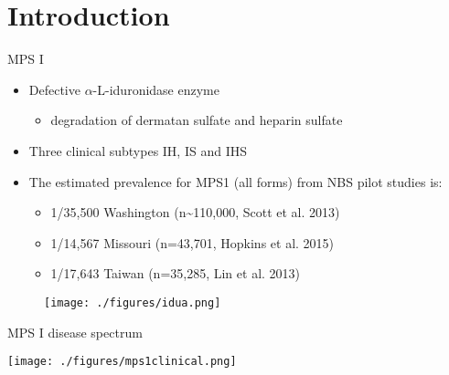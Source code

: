 \documentclass[presentation, smaller]{beamer}
\begin{document}
\section{Introduction}
\label{sec:org4dbc379}
\begin{frame}[label={sec:org6b2c76e}]{MPS I}
\begin{itemize}
\item Defective \(\alpha\)-L-iduronidase enzyme
\begin{itemize}
\item degradation of dermatan sulfate and heparin sulfate
\end{itemize}
\item Three clinical subtypes IH, IS and IHS

\item The estimated prevalence for MPS1 (all forms) from NBS pilot studies is: 
\begin{itemize}
\item 1/35,500 Washington ​(n\textasciitilde{}110,000, Scott et al. 2013)
\item 1/14,567 Missouri ​(n=43,701, Hopkins et al. 2015)
\item 1/17,643 Taiwan ​(n=35,285, Lin et al. 2013)
\end{itemize}
\end{itemize}


\begin{figure}[htbp]
\centering
\texttt{[image: ./figures/idua.png]}
\label{fig:orgc1074be}
\end{figure}
\end{frame}


\begin{frame}[label={sec:orgffc4b7c}]{MPS I disease spectrum}
\begin{center}
\texttt{[image: ./figures/mps1clinical.png]}
\label{orgc5ff427}
\end{center}
\end{frame}
\end{document}
